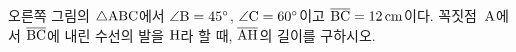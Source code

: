 \noindent\begin{minipage}[t]{0.58\linewidth}\vspace{0pt}\raggedright 오른쪽 그림의 $\triangle\mathrm{ABC}$에서 $\angle\mathrm{B}=45^\circ$, $\angle\mathrm{C}=60^\circ$이고 $\overline{\mathrm{BC}}=12\,\mathrm{cm}$이다. 꼭짓점~$\mathrm{A}$에서 $\overline{\mathrm{BC}}$에 내린 수선의 발을 $\mathrm{H}$라 할 때, $\overline{\mathrm{AH}}$의 길이를 구하시오.\end{minipage}\hfill\begin{minipage}[t]{0.4\linewidth}\vspace{0pt}\centering \resizebox{\ifdim\width>\linewidth\linewidth\else\width\fi}{!}{}\end{minipage}\par
